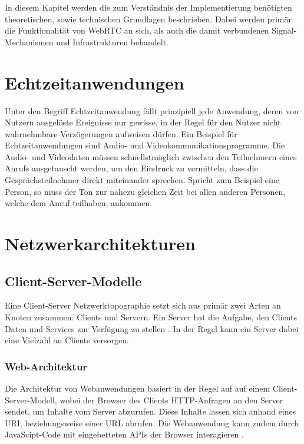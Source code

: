 In diesem Kapitel werden die zum Verständnis der Implementierung benötigten theoretischen, sowie technischen Grundlagen beschrieben. Dabei werden primär die Funktionalität von \acs{WebRTC} an sich, als auch die damit verbundenen Signal-Mechanismen und Infrastrukturen behandelt.

\section{Echtzeitanwendungen}
Unter den Begriff Echtzeitanwendung fällt prinzipiell jede Anwendung, deren von Nutzern ausgelöste Ereignisse nur gewisse, in der Regel für den Nutzer nicht wahrnehmbare Verzögerungen aufweisen dürfen. Ein Beispiel für Echtzeitanwendungen sind Audio- und Videokommunikationsprogramme. Die Audio- und Videodaten müssen schnellstmöglich zwischen den Teilnehmern eines Anrufs ausgetauscht werden, um den Eindruck zu vermitteln, dass die Gesprächsteilnehmer direkt miteinander sprechen. Spricht zum Beispiel eine Person, so muss der Ton zur nahezu gleichen Zeit bei allen anderen Personen, welche dem Anruf teilhaben, ankommen.

\section{Netzwerkarchitekturen}

\subsection{Client-Server-Modelle}
Eine Client-Server Netzwerktopographie setzt sich aus primär zwei Arten an Knoten zusammen: Clients und Servern. Ein Server hat die Aufgabe, den Clients Daten und Services zur Verfügung zu stellen \cite{silveira2015}. In der Regel kann ein Server dabei eine Vielzahl an Clients versorgen.\par

\subsubsection{Web-Architektur}
Die Architektur von Webanwendungen basiert in der Regel auf auf einem Client-Server-Modell, wobei der Browser des Clients \acf{HTTP}-Anfragen an den Server sendet, um Inhalte vom Server abzurufen. Diese Inhalte lassen sich anhand eines \acf{URI}, beziehungsweise einer \acf{URL} abrufen. Die Webanwendung kann zudem durch JavaScipt-Code mit eingebetteten \acf{API}s der Browser interagieren \cite{lorento2014}.\par

